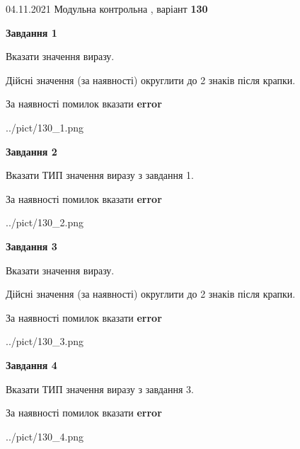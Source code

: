 \documentclass[11pt, ukrainian]{article}
\begin{document}
{04.11.2021 Модульна контрольна , варіант  \No \textbf { 130 }\par}
{
\begin {large}
{\begin {center}\textbf{Завдання 1}\end {center}}\par
Вказати значення виразу. \par
Дійсні значення (за наявності) округлити до 2 знаків після крапки. \par
За наявності помилок вказати \textbf{error}

\begin{center}
	{../pict/130_1.png}
\end{center}
\newpage

{\begin {center}\textbf{Завдання 2}\end {center}}\par
Вказати ТИП значення виразу з завдання 1. \par
За наявності помилок вказати \textbf{error}

\begin{center}
	{../pict/130_2.png}
\end{center}
\newpage

{\begin {center}\textbf{Завдання 3}\end {center}}\par
Вказати значення виразу. \par
Дійсні значення (за наявності) округлити до 2 знаків після крапки. \par
За наявності помилок вказати \textbf{error}

\begin{center}
	{../pict/130_3.png}
\end{center}
\newpage

{\begin {center}\textbf{Завдання 4}\end {center}}\par
Вказати ТИП значення виразу з завдання 3. \par
За наявності помилок вказати \textbf{error}

\begin{center}
	{../pict/130_4.png}
\end{center}
\newpage


\end{large}}
\end{document}
